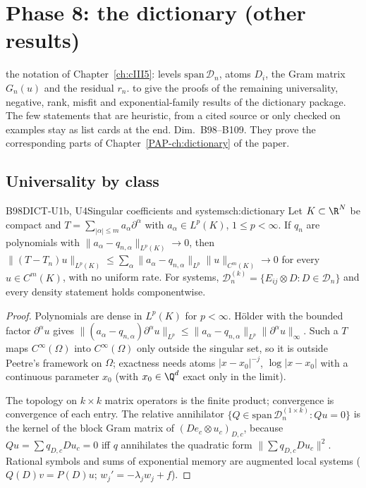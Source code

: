 \chapter[Dictionary]{Phase 8: the dictionary (other results)}\label{ch:cIV3}
\chapterbrief
{the notation of Chapter~\ref{ch:cIII5}: levels $\mathrm{span}\,\mathcal D_n$, atoms $D_i$, the Gram matrix $G_n(u)$ and the residual $r_n$.}
{to give the proofs of the remaining universality, negative, rank, misfit and exponential-family results of the dictionary package. The few statements that are heuristic, from a cited source or only checked on examples stay as list cards at the end.}
{Dim.~B98--B109. They prove the corresponding parts of Chapter~\ref{PAP-ch:dictionary} of the paper.}

\section{Universality by class}

\begin{dimcard}{B98}{DICT-U1b, U4}{Singular coefficients and systems}{\pw}{ch:dictionary}
Let $K\subset\R^N$ be compact and $T=\sum_{|\alpha|\le m}a_\alpha\partial^\alpha$ with $a_\alpha\in L^p(K)$, $1\le p<\infty$. If $q_n$ are polynomials with $\|a_\alpha-q_{n,\alpha}\|_{L^p(K)}\to0$, then $\|(T-T_n)u\|_{L^p(K)}\le\sum_\alpha\|a_\alpha-q_{n,\alpha}\|_{L^p}\|u\|_{C^m(K)}\to0$ for every $u\in C^m(K)$, with no uniform rate. For systems, $\mathcal D^{(k)}_n=\{E_{ij}\otimes D:D\in\mathcal D_n\}$ and every density statement holds componentwise.
\end{dimcard}

\begin{proof}
Polynomials are dense in $L^p(K)$ for $p<\infty$. Hölder with the bounded factor $\partial^\alpha u$ gives $\|(a_\alpha-q_{n,\alpha})\partial^\alpha u\|_{L^p}\le\|a_\alpha-q_{n,\alpha}\|_{L^p}\|\partial^\alpha u\|_{\infty}$. Such a $T$ maps $C^\infty(\Omega)$ into $C^\infty(\Omega)$ only outside the singular set, so it is outside Peetre's framework on $\Omega$; exactness needs atoms $|x-x_0|^{-j}$, $\log|x-x_0|$ with a continuous parameter $x_0$ (with $x_0\in\Q^d$ exact only in the limit).

The topology on $k\times k$ matrix operators is the finite product; convergence is convergence of each entry. The relative annihilator $\{Q\in\mathrm{span}\,\mathcal D^{(1\times k)}_n:Qu=0\}$ is the kernel of the block Gram matrix of $(De_c\otimes u_c)_{D,c}$, because $Qu=\sum q_{D,c}Du_c=0$ iff $q$ annihilates the quadratic form $\|\sum q_{D,c}Du_c\|^2$. Rational symbols and sums of exponential memory are augmented local systems ($Q(D)v=P(D)u$; $w_j'=-\lambda_jw_j+f$).

\end{proof}

